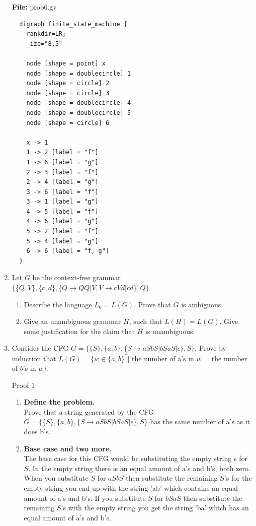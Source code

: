 \documentclass[a4paper]{article}
\begin{document}
\begin{enumerate}
    \newpage
    \textbf{File:} prob6.gv
    \begin{verbatim}
  digraph finite_state_machine {
    rankdir=LR;
    _ize="8,5"
  
    node [shape = point] x
    node [shape = doublecircle] 1
    node [shape = circle] 2
    node [shape = circle] 3
    node [shape = doublecircle] 4
    node [shape = doublecircle] 5
    node [shape = circle] 6
  
    x -> 1
    1 -> 2 [label = "f"]
    1 -> 6 [label = "g"]
    2 -> 3 [label = "f"]
    2 -> 4 [label = "g"]
    3 -> 6 [label = "f"]
    3 -> 1 [label = "g"]
    4 -> 5 [label = "f"]
    4 -> 6 [label = "g"]
    5 -> 2 [label = "f"]
    5 -> 4 [label = "g"]
    6 -> 6 [label = "f, g"]
  }
    \end{verbatim}


    \item Let $G$ be the context-free grammar $\{ \{Q,V\}, \{c,d\},\{ Q \rightarrow QQ|V ,
    V \rightarrow cV d|cd \}, Q\}$.
    \begin{enumerate}

      \item Describe the language $L_{6} = L(G)$. Prove that $G$ is ambiguous.
    

      \item  Give an unambiguous grammar $H$, such that $L(H) = L(G)$. Give
      some justification for the claim that $H$ is unambiguous.

    \end{enumerate}

    \newpage
    \item  Consider the CFG $G = \{ \{S\}, \{a, b\}, \{S \rightarrow aSbS|bSaS|\epsilon \}, S \}$. 
    Prove by induction that $L(G) = \{ w \in \{ a, b\}^{*} |$ the number of a’s in 
    $w$ = the number of
    $b$’s in $w \}$.

    Proof 1 
    \begin{enumerate}

      \item \textbf{Define the problem.} \\
      Prove that a string generated by the CFG $G = \{ \{S\}, \{a, b\}, \{S \rightarrow aSbS|bSaS|\epsilon \}, S \}$
      has the same number of a's as it does b's.

      \item \textbf{Base case and two more.} \\
      The base case for this CFG would be substituting the empty string $\epsilon$ 
      for $S$. In the empty string there is an equal amount of a's and b's, both zero.
      When you substitute $S$ for $aSbS$ then substitute the remaining $S$'s for the 
      empty string you end up with the string 'ab' which contains an equal amount of a's
      and b's. If you substitute $S$ for $bSaS$ then substitute the remaining $S$'s with
      the empty string you get the string 'ba' which has an equal amount of a's and b's.


\end{enumerate}
\end{enumerate}
\end{document}

